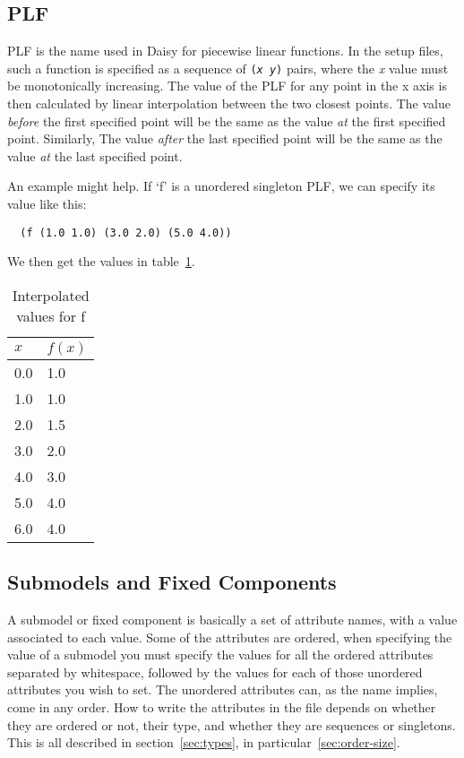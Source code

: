 \subsection{PLF}
\label{type:plf}

PLF is the name used in Daisy for piecewise linear functions.  In the
setup files, such a function is specified as a sequence of
\texttt{(\emph{x} \emph{y})} pairs, where the \emph{x} value must be
monotonically increasing.  The value of the PLF for any point in the x
axis is then calculated by linear interpolation between the two
closest points.  The value \emph{before} the first specified point
will be the same as the value \emph{at} the first specified point.
Similarly, The value \emph{after} the last specified point will be the
same as the value \emph{at} the last specified point.

An example might help.  If `f' is a unordered singleton PLF, we can
specify its value like this:
\begin{verbatim}
  (f (1.0 1.0) (3.0 2.0) (5.0 4.0))
\end{verbatim}
We then get the values in table~\ref{tab:plf}.

\begin{table}[htbp]
  \begin{center}
    \begin{tabular}{l|l}
      $x$ & $f(x)$ \\\hline
      0.0 & 1.0 \\\hline
      1.0 & 1.0 \\\hline
      2.0 & 1.5 \\\hline
      3.0 & 2.0 \\\hline
      4.0 & 3.0 \\\hline
      5.0 & 4.0 \\\hline
      6.0 & 4.0 
    \end{tabular}
    \caption{Interpolated values for f}
    \label{tab:plf}
  \end{center}
\end{table}

\subsection{Submodels and Fixed Components}
\label{type:alist}

A submodel or fixed component is basically a set of attribute names,
with a value associated to each value.  Some of the attributes are
ordered, when specifying the value of a submodel you must specify the
values for all the ordered attributes separated by whitespace,
followed by the values for each of those unordered attributes you wish
to set.  The unordered attributes can, as the name implies, come in
any order.  How to write the attributes in the file depends on whether
they are ordered or not, their type, and whether they are sequences or
singletons.  This is all described in section~\ref{sec:types}, in
particular~\ref{sec:order-size}.

